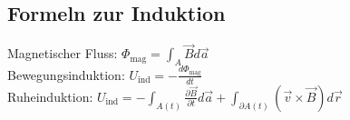 \subsection{Formeln zur Induktion}
Magnetischer Fluss: $\Phi_{\text{mag}} = \int_A \vec B d \vec a$ \\
Bewegungsinduktion: $U_{\text{ind}} = - \frac{d \Phi_{\text{mag}}}{dt}$ \\
Ruheinduktion: $U_{\text{ind}} = - \int_{A(t)} \frac{\partial \vec B}{\partial t} d \vec a + \int_{\partial A(t)} (\vec v \times \vec B) d \vec r$